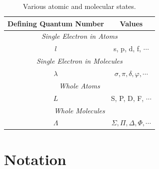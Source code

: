 \documentclass[11pt, twoside, fleqn]{report}
\begin{document}
\begin{table}[H]
    \centering
    \caption{Various atomic and molecular states.}
    \label{t:states}
    \begin{tabular}{cc}
        \toprule
        Defining Quantum Number & Values \\
        \midrule
        \multicolumn{2}{c}{\textit{Single Electron in Atoms}} \\
        \cmidrule(lr){1-2}
        $l$ & s, p, d, f, $\dotsb$ \\
        \multicolumn{2}{c}{\textit{Single Electron in Molecules}} \\
        \cmidrule(lr){1-2}
        $\lambda$ & $\sigma, \pi, \delta, \varphi, \dotsb$ \\
        \multicolumn{2}{c}{\textit{Whole Atoms}} \\
        \cmidrule(lr){1-2}
        $L$ & S, P, D, F, $\dotsb$ \\
        \multicolumn{2}{c}{\textit{Whole Molecules}} \\
        \cmidrule(lr){1-2}
        $\Lambda$ & $\Sigma, \Pi, \Delta, \Phi, \dotsb$ \\
        \bottomrule
    \end{tabular}
\end{table}

\chapter{Notation}
\label{a:notation}
\end{document}
